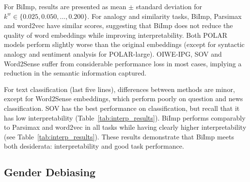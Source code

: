 \documentclass[11pt,a4paper]{article}
\def\proposedmethod{BiImp}
\begin{document}
For \proposedmethod{}, results are presented as mean $\pm$
standard deviation for $k^w \in \{0.025,0.050,...,0.200\}$. For analogy
and similarity tasks, \proposedmethod{}, Parsimax and
word2vec have similar scores, suggesting that
\proposedmethod{} does not reduce the quality of 
word embeddings while
improving interpretability. Both POLAR models perform
slightly worse than the original embeddings (except
for syntactic analogy and sentiment analysis for
POLAR-large). OIWE-IPG, SOV and Word2Sense suffer from
considerable performance loss in most 
cases, implying a reduction in the
semantic information captured.

For text
classification (last five lines),
differences between methods are minor, 
except for Word2Sense embeddings, which perform poorly on
question and news classification.
SOV \citep{faruqui15sparse} has the
best performance on  classification,
but recall that it has low interpretability (Table~\ref{tab:interp_results}).
\proposedmethod{}
performs comparably
to Parsimax and  word2vec
in all tasks while having clearly higher
interpretability (see Table~\ref{tab:interp_results}).
These results demonstrate that \proposedmethod{} meets both
desiderata: interpretability and good task performance.



\subsection{Gender Debiasing}
\end{document}
